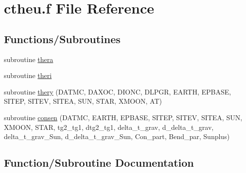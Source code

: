 \hypertarget{ctheu_8f}{}\section{ctheu.\+f File Reference}
\label{ctheu_8f}
\subsection*{Functions/\+Subroutines}
\begin{DoxyCompactItemize}
\item 
subroutine \hyperlink{ctheu_8f_acf57ec8d03b0b560bf0b8cce7562ef05}{thera}
\item 
subroutine \hyperlink{ctheu_8f_af6456aaf632220895a84571dc362ed83}{theri}
\item 
subroutine \hyperlink{ctheu_8f_a1e3f1a5bae834f4f8f58be58a30740f2}{thery} (D\+A\+T\+MC, D\+A\+X\+OC, D\+I\+O\+NC, D\+L\+P\+GR, E\+A\+R\+TH, E\+P\+B\+A\+SE, S\+I\+T\+EP, S\+I\+T\+EV, S\+I\+T\+EA, S\+UN, S\+T\+AR, X\+M\+O\+ON, AT)
\item 
subroutine \hyperlink{ctheu_8f_ac376445cf9eaed7528ffe8030981b063}{consen} (D\+A\+T\+MC, E\+A\+R\+TH, E\+P\+B\+A\+SE, S\+I\+T\+EP, S\+I\+T\+EV, S\+I\+T\+EA, S\+UN, X\+M\+O\+ON, S\+T\+AR, tg2\+\_\+tg1, dtg2\+\_\+tg1, delta\+\_\+t\+\_\+grav, d\+\_\+delta\+\_\+t\+\_\+grav, delta\+\_\+t\+\_\+grav\+\_\+\+Sun, d\+\_\+delta\+\_\+t\+\_\+grav\+\_\+\+Sun, Con\+\_\+part, Bend\+\_\+par, Sunplus)
\end{DoxyCompactItemize}


\subsection{Function/\+Subroutine Documentation}
\mbox{\label{ctheu_8f_ac376445cf9eaed7528ffe8030981b063}} 
